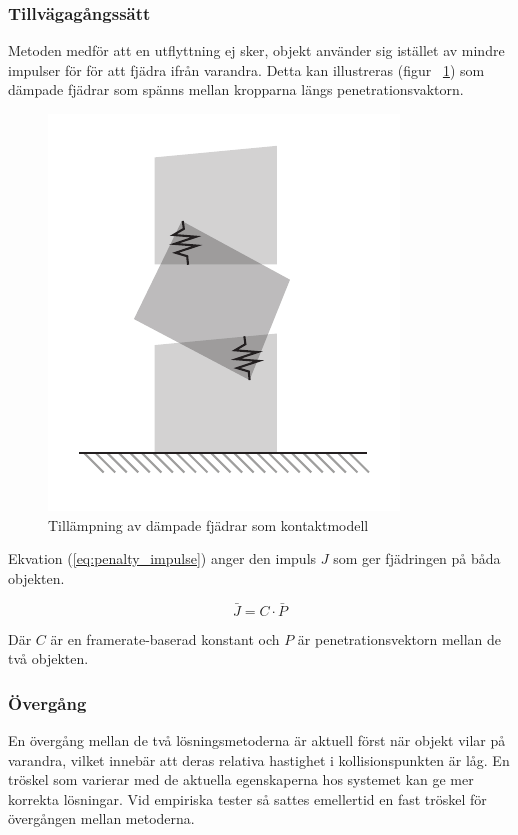 \documentclass[a4paper,12pt,twopage,swedish]{article}
\begin{document}
\subsubsection{Tillvägagångssätt}
Metoden medför att en utflyttning ej sker, objekt använder sig istället av mindre impulser för för att fjädra ifrån varandra. Detta kan illustreras (figur ~\ref{fig:penalty}) som dämpade fjädrar som spänns mellan kropparna längs penetrationsvaktorn.

\begin{figure}[H]
	\centering
	\includegraphics{illustrations/penalty.pdf}
	\caption{Tillämpning av dämpade fjädrar som kontaktmodell}
	\label{fig:penalty}
\end{figure}

Ekvation (\ref{eq:penalty_impulse}) anger den impuls $J$ som ger fjädringen på båda objekten.

\begin{equation}\label{eq:penalty_impulse}
\bar{J} = C \cdot \bar{P}
\end{equation}

Där $C$ är en framerate-baserad konstant och $P$ är penetrationsvektorn mellan de två objekten.

\subsubsection{Övergång}
En övergång mellan de två lösningsmetoderna är aktuell först när objekt vilar på varandra, vilket innebär att deras relativa hastighet i kollisionspunkten är låg.
En tröskel som varierar med de aktuella egenskaperna hos systemet kan ge mer korrekta lösningar. Vid empiriska tester så sattes emellertid en fast tröskel för övergången mellan metoderna.
\end{document}
